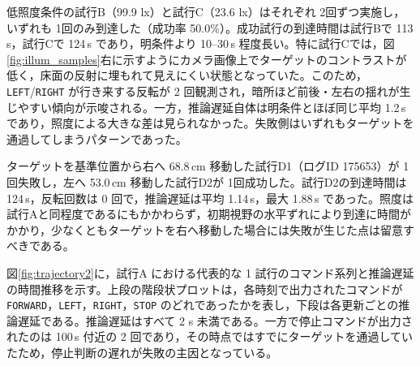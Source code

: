 \documentclass[a4paper,11pt]{ltjsreport}
\begin{document}
低照度条件の試行B（99.9 lx）と試行C（23.6 lx）はそれぞれ 2回ずつ実施し，いずれも 1回のみ到達した（成功率 50.0\%）。成功試行の到達時間は試行Bで 113\,s，試行Cで 124\,s であり，明条件より 10--30\,s 程度長い。特に試行Cでは，図\ref{fig:illum_samples}右に示すようにカメラ画像上でターゲットのコントラストが低く，床面の反射に埋もれて見えにくい状態となっていた。このため，\texttt{LEFT}/\texttt{RIGHT} が行き来する反転が 2 回観測され，暗所ほど前後・左右の揺れが生じやすい傾向が示唆される。一方，推論遅延自体は明条件とほぼ同じ平均 1.2\,s であり，照度による大きな差は見られなかった。失敗側はいずれもターゲットを通過してしまうパターンであった。

ターゲットを基準位置から右へ 68.8\,cm 移動した試行D1（ログID 175653）が 1回失敗し，左へ 53.0\,cm 移動した試行D2が 1回成功した。試行D2の到達時間は 124\,s，反転回数は 0 回で，推論遅延は平均 1.14\,s，最大 1.88\,s であった。照度は試行Aと同程度であるにもかかわらず，初期視野の水平ずれにより到達に時間がかかり，少なくともターゲットを右へ移動した場合には失敗が生じた点は留意すべきである。

図\ref{fig:trajectory2}に，試行A における代表的な 1 試行のコマンド系列と推論遅延の時間推移を示す。上段の階段状プロットは，各時刻で出力されたコマンドが \texttt{FORWARD}，\texttt{LEFT}，\texttt{RIGHT}，\texttt{STOP} のどれであったかを表し，下段は各更新ごとの推論遅延である。推論遅延はすべて 2 s 未満である。一方で停止コマンドが出力されたのは 100\,s 付近の 2 回であり，その時点ではすでにターゲットを通過していたため，停止判断の遅れが失敗の主因となっている。
\end{document}
